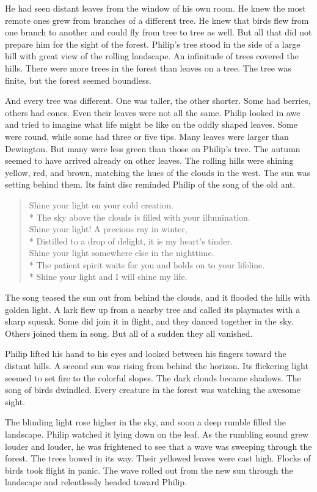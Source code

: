 \documentclass[10pt]{memoir}
\newcommand{\sunsong}{
  Shine your light on your cold creation. \\*
  The sky above the clouds is filled with your illumination. \\
  Shine your light! A precious ray in winter, \\*
  Distilled to a drop of delight, it is my heart's tinder. \\
  Shine your light somewhere else in the nighttime. \\*
  The patient spirit waits for you and holds on to your lifeline. \\*
  Shine your light and I will shine my life.
}
\begin{document}
He had seen distant leaves from the window of his own room. He knew the most
remote ones grew from branches of a different tree. He knew that birds flew
from one branch to another and could fly from tree to tree as well. But all
that did not prepare him for the sight of the forest. Philip's tree stood in
the side of a large hill with great view of the rolling landscape. An
infinitude of trees covered the hills. There were more trees in the forest than
leaves on a tree. The tree was finite, but the forest seemed boundless.

And every tree was different. One was taller, the other shorter. Some had
berries, others had cones. Even their leaves were not all the same. Philip
looked in awe and tried to imagine what life might be like on the oddly shaped
leaves. Some were round, while some had three or five tips. Many leaves were
larger than Dewington. But many were less green than those on Philip's tree.
The autumn seemed to have arrived already on other leaves. The rolling hills
were shining yellow, red, and brown, matching the hues of the clouds in the
west. The sun was setting behind them. Its faint disc reminded Philip of the
song of the old ant.


\begin{verse}
\sunsong
\end{verse}


The song teased the sun out from behind the clouds, and it flooded the hills
with golden light. A lark flew up from a nearby tree and called its playmates
with a sharp squeak. Some did join it in flight, and they danced together in
the sky. Others joined them in song. But all of a sudden they all vanished.

Philip lifted his hand to his eyes and looked between his fingers toward the
distant hills. A second sun was rising from behind the horizon. Its flickering
light seemed to set fire to the colorful slopes. The dark clouds became
shadows. The song of birds dwindled. Every creature in the forest was watching
the awesome sight.

The blinding light rose higher in the sky, and soon a deep rumble filled the
landscape. Philip watched it lying down on the leaf. As the rumbling sound grew
louder and louder, he was frightened to see that a wave was sweeping through
the forest. The trees bowed in its way. Their yellowed leaves were cast high.
Flocks of birds took flight in panic. The wave rolled out from the new sun
through the landscape and relentlessly headed toward Philip.
\end{document}
